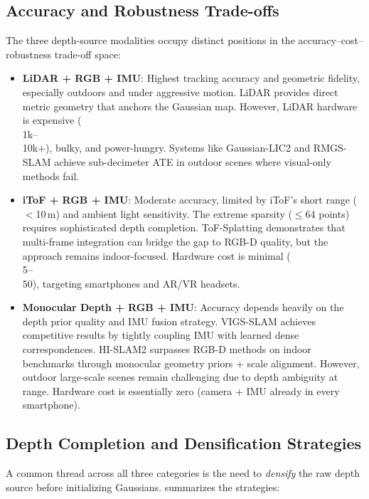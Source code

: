 \subsection{Accuracy and Robustness Trade-offs}

The three depth-source modalities occupy distinct positions in the
accuracy--cost--robustness trade-off space:

\begin{itemize}
    \item \textbf{LiDAR + RGB + IMU}: Highest tracking accuracy and
    geometric fidelity, especially outdoors and under aggressive motion.
    LiDAR provides direct metric geometry that anchors the Gaussian map.
    However, LiDAR hardware is expensive ($$\,$$1k--$$\,$$10k+), bulky, and
    power-hungry.  Systems like Gaussian-LIC2 and RMGS-SLAM achieve
    sub-decimeter ATE in outdoor scenes where visual-only methods fail.

    \item \textbf{iToF + RGB + IMU}: Moderate accuracy, limited by iToF's
    short range ($<$10\,m) and ambient light sensitivity.  The extreme
    sparsity ($\leq$64 points) requires sophisticated depth completion.
    ToF-Splatting demonstrates that multi-frame integration can bridge the
    gap to RGB-D quality, but the approach remains indoor-focused.
    Hardware cost is minimal ($$\,$$5--$$\,$$50), targeting smartphones
    and AR/VR headsets.

    \item \textbf{Monocular Depth + RGB + IMU}: Accuracy depends heavily on
    the depth prior quality and IMU fusion strategy.  VIGS-SLAM achieves
    competitive results by tightly coupling IMU with learned dense
    correspondences.  HI-SLAM2 surpasses RGB-D methods on indoor benchmarks
    through monocular geometry priors + scale alignment.  However, outdoor
    large-scale scenes remain challenging due to depth ambiguity at range.
    Hardware cost is essentially zero (camera + IMU already in every
    smartphone).
\end{itemize}

\subsection{Depth Completion and Densification Strategies}

A common thread across all three categories is the need to \emph{densify}
the raw depth source before initializing Gaussians.  
summarizes the strategies:

